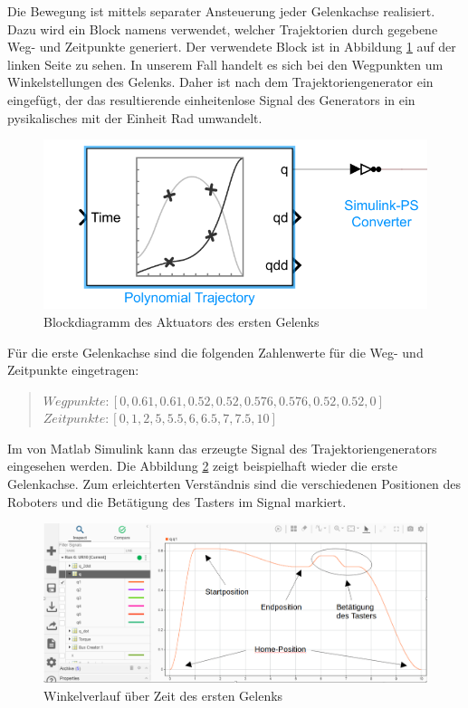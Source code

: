 Die Bewegung ist mittels separater Ansteuerung jeder Gelenkachse realisiert.
Dazu wird ein Block namens  verwendet, welcher Trajektorien durch gegebene Weg- und Zeitpunkte generiert.
Der verwendete Block ist in Abbildung \ref{fig:ur10_trajectoriengenerator} auf der linken Seite zu sehen.
In unserem Fall handelt es sich bei den Wegpunkten um Winkelstellungen des Gelenks.
Daher ist nach dem Trajektoriengenerator ein  eingefügt, der das resultierende einheitenlose Signal des Generators in ein pysikalisches mit der Einheit Rad umwandelt.

\begin{figure}[!htbp]
	\centering
	\includegraphics[width=0.55\linewidth]{grafic/Trajectoriengenerator}
	\caption{Blockdiagramm des Aktuators des ersten Gelenks}
	\label{fig:ur10_trajectoriengenerator}
\end{figure}


Für die erste Gelenkachse sind die folgenden Zahlenwerte für die Weg- und Zeitpunkte eingetragen:

\begin{quote}
$Wegpunkte: [0, 0.61, 0.61, 0.52, 0.52, 0.576, 0.576, 0.52, 0.52, 0] $ \\
$Zeitpunkte: [0, 1, 2, 5, 5.5, 6, 6.5, 7, 7.5, 10]$
\end{quote}

Im  von Matlab Simulink kann das erzeugte Signal des Trajektoriengenerators eingesehen werden.
Die Abbildung \ref{fig:data_inspector_rotation_angle} zeigt beispielhaft wieder die erste Gelenkachse.
Zum erleichterten Verständnis sind die verschiedenen Positionen des Roboters und die Betätigung des Tasters im Signal markiert.

\begin{figure}[!htbp]
	\centering
	\includegraphics[width=1.0\linewidth]{grafic/data_inspector_Winkel_erstes_Gelenk}
	\caption{Winkelverlauf über Zeit des ersten Gelenks}
	\label{fig:data_inspector_rotation_angle}
\end{figure}

